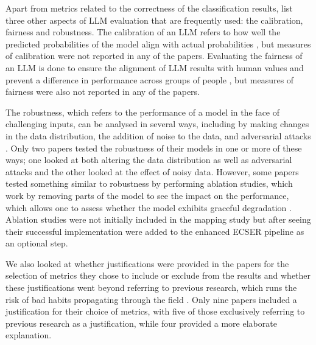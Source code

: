\documentclass[a4paper]{article}
\begin{document}
Apart from metrics related to the correctness of the classification results, \textcite{chang2023} list three other aspects of LLM evaluation that are frequently used: the calibration, fairness and robustness. The calibration of an LLM refers to how well the predicted probabilities of the model align with actual probabilities \cite{nixon2019calibration,guo2017calibration}, but measures of calibration were not reported in any of the papers. Evaluating the fairness of an LLM is done to ensure the alignment of LLM results with human values and prevent a difference in performance across groups of people \cite{liu2024}, but measures of fairness were also not reported in any of the papers. 

The robustness, which refers to the performance of a model in the face of challenging inputs, can be analysed in several ways, including by making changes in the data distribution, the addition of noise to the data, and adversarial attacks \cite{chang2023}. Only two papers tested the robustness of their models in one or more of these ways; one looked at both altering the data distribution as well as adversarial attacks and the other looked at the effect of noisy data. However, some papers tested something similar to robustness by performing ablation studies, which work by removing parts of the model to see the impact on the performance, which allows one to assess whether the model exhibits graceful degradation \cite{meyes2019ablation}. Ablation studies were not initially included in the mapping study but after seeing their successful implementation were added to the enhanced ECSER pipeline as an optional step.


We also looked at whether justifications were provided in the papers for the selection of metrics they chose to include or exclude from the results and whether these justifications went beyond referring to previous research, which runs the risk of bad habits propagating through the field \cite{Dellanna2022}. Only nine papers included a justification for their choice of metrics, with five of those exclusively referring to previous research as a justification, while four provided a more elaborate explanation.
\end{document}
